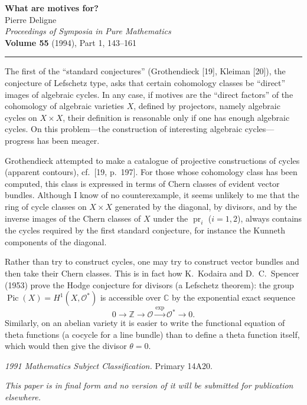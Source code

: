\documentclass[11pt,a4paper]{article}
\theoremstyle{plain}
\theoremstyle{definition}
\DeclareMathOperator{\Pic}{Pic}
\DeclareMathOperator{\pr}{pr}
\newcommand{\Z}{\mathbb{Z}}
\newcommand{\C}{\mathbb{C}}
\begin{document}
\begin{center}
{\Large\textbf{What are motives for?}}\\[1em]
{\large Pierre Deligne}\\[1em]
\textit{Proceedings of Symposia in Pure Mathematics}\\
\textbf{Volume 55} (1994), Part 1, 143--161
\end{center}

\vspace{1em}
\noindent\rule{\textwidth}{0.4pt}
\vspace{0.5em}

The first of the ``standard conjectures'' (Grothendieck [19], Kleiman [20]), the conjecture of Lefschetz type, asks that certain cohomology classes be ``direct'' images of algebraic cycles. In any case, if motives are the ``direct factors'' of the cohomology of algebraic varieties $X$, defined by projectors, namely algebraic cycles on $X \times X$, their definition is reasonable only if one has enough algebraic cycles. On this problem---the construction of interesting algebraic cycles---progress has been meager.

Grothendieck attempted to make a catalogue of projective constructions of cycles (apparent contours), cf.~[19, p.~197]. For those whose cohomology class has been computed, this class is expressed in terms of Chern classes of evident vector bundles. Although I know of no counterexample, it seems unlikely to me that the ring of cycle classes on $X \times X$ generated by the diagonal, by divisors, and by the inverse images of the Chern classes of $X$ under the $\pr_i$ ($i=1,2$), always contains the cycles required by the first standard conjecture, for instance the Kunneth components of the diagonal.

Rather than try to construct cycles, one may try to construct vector bundles and then take their Chern classes. This is in fact how K.~Kodaira and D.~C.~Spencer (1953) prove the Hodge conjecture for divisors (a Lefschetz theorem): the group $\Pic(X)=H^1(X,\mathcal{O}^*)$ is accessible over $\C$ by the exponential exact sequence
$$
0 \to \Z \to \mathcal{O} \xrightarrow{\exp} \mathcal{O}^* \to 0.
$$
Similarly, on an abelian variety it is easier to write the functional equation of theta functions (a cocycle for a line bundle) than to define a theta function itself, which would then give the divisor $\theta=0$.

\textit{1991 Mathematics Subject Classification.} Primary 14A20.

\textit{This paper is in final form and no version of it will be submitted for publication elsewhere.}
\end{document}
